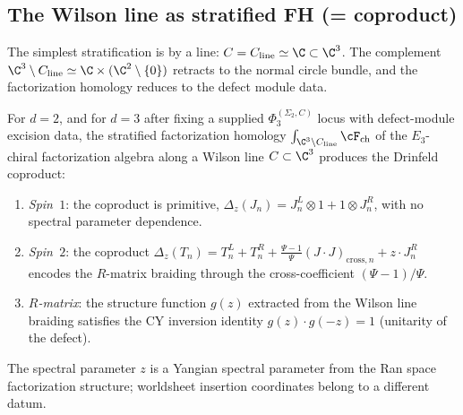 \subsection{The Wilson line as stratified FH (= coproduct)}
\label{subsec:wilson-line-strat-fh}

The simplest stratification is by a line: $C = C_{\mathrm{line}} \simeq \C \subset \C^3$. The complement $\C^3 \setminus C_{\mathrm{line}} \simeq \C \times (\C^2 \setminus \{0\})$ retracts to the normal circle bundle, and the factorization homology reduces to the defect module data.

\begin{proposition}[Wilson line = Drinfeld coproduct]
\label{prop:wilson-line-coproduct}
For $d=2$, and for $d=3$ after fixing a supplied
\(\Phi_3^{(\Sigma_2,C)}\) locus with defect-module excision data, the
stratified factorization homology
$\int_{\C^3 \setminus C_{\mathrm{line}}} \cF_{\mathrm{ch}}$ of the
$E_3$-chiral factorization algebra along a Wilson line
$C \subset \C^3$ produces the Drinfeld coproduct:
\begin{enumerate}[label=\textup{(\roman*)}]
 \item \emph{Spin~$1$}: the coproduct is primitive, $\Delta_z(J_n) = J_n^L \otimes 1 + 1 \otimes J_n^R$, with no spectral parameter dependence.
 \item \emph{Spin~$2$}: the coproduct $\Delta_z(T_n) = T_n^L + T_n^R + \frac{\Psi - 1}{\Psi} (J \cdot J)_{\mathrm{cross}, n} + z \cdot J_n^R$ encodes the $R$-matrix braiding through the cross-coefficient $(\Psi - 1)/\Psi$.
 \item \emph{$R$-matrix}: the structure function $g(z)$ extracted from the Wilson line braiding satisfies the CY inversion identity $g(z) \cdot g(-z) = 1$ (unitarity of the defect).
\end{enumerate}
The spectral parameter $z$ is a Yangian spectral parameter from the Ran
space factorization structure; worldsheet insertion coordinates belong
to a different datum.
\end{proposition}


